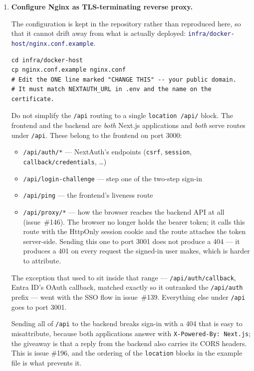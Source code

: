 \documentclass[12pt,a4paper,twoside]{report}
\newcommand{\code}[1]{\texttt{#1}}
\newcommand{\file}[1]{\texttt{\textcolor{MidnightBlue}{#1}}}
\begin{document}
\begin{enumerate}
\item \textbf{Configure Nginx as TLS-terminating reverse proxy.}

The configuration is kept in the repository rather than reproduced here,
so that it cannot drift away from what is actually deployed:
\file{infra/docker-host/nginx.conf.example}.

\begin{lstlisting}[style=bash]
cd infra/docker-host
cp nginx.conf.example nginx.conf
# Edit the ONE line marked "CHANGE THIS" -- your public domain.
# It must match NEXTAUTH_URL in .env and the name on the certificate.
\end{lstlisting}

\begin{tcolorbox}[warnboxstyle]
Do not simplify the \code{/api} routing to a single
\code{location /api/} block. The frontend and the backend are \emph{both}
Next.js applications and \emph{both} serve routes under \code{/api}. These
belong to the frontend on port 3000:

\begin{itemize}
  \item \code{/api/auth/*} --- NextAuth's endpoints
        (\code{csrf}, \code{session}, \code{callback/credentials}, \ldots)
  \item \code{/api/login-challenge} --- step one of the two-step sign-in
  \item \code{/api/ping} --- the frontend's liveness route
  \item \code{/api/proxy/*} --- how the browser reaches the backend API at all
        (issue~\#146). The browser no longer holds the bearer token; it calls
        this route with the HttpOnly session cookie and the route attaches the
        token server-side. Sending this one to port 3001 does not produce a 404
        --- it produces a 401 on every request the signed-in user makes, which
        is harder to attribute.
\end{itemize}

\noindent
The exception that used to sit inside that range --- \code{/api/auth/callback},
Entra ID's OAuth callback, matched exactly so it outranked the \code{/api/auth}
prefix --- went with the SSO flow in issue~\#139. Everything else under
\code{/api} goes to port 3001.

Sending all of \code{/api} to the backend breaks sign-in with a 404 that is easy
to misattribute, because both applications answer with
\code{X-Powered-By: Next.js}; the giveaway is that a reply from the backend also
carries its CORS headers. This is issue \#196, and the ordering of the
\code{location} blocks in the example file is what prevents it.
\end{tcolorbox}


\end{enumerate}
\end{document}
